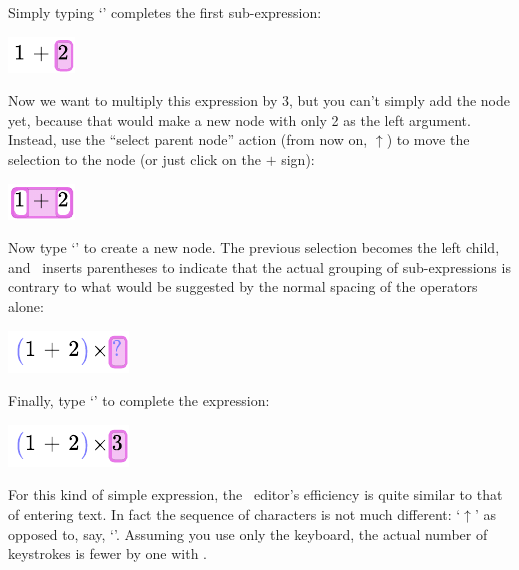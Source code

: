 Simply typing `' completes the first sub-expression:
\begin{center}
\includegraphics{src/image/expr4.pdf}
\end{center}

Now we want to multiply this expression by 3, but you can't simply add the  node yet, because that would make a new node with only 2 as the left argument. Instead, use the ``select parent node'' action (from now on, $\uparrow$) to move the selection to the  node (or just click on the $+$ sign):
\begin{center}
\includegraphics{src/image/expr5.pdf}
\end{center}

Now type `\clojure{*}' to create a new node. The previous selection becomes the left child, and \Meta\ inserts parentheses to indicate that the actual grouping of sub-expressions is contrary to what would be suggested by the normal spacing of the operators alone:
\begin{center}
\includegraphics{src/image/expr6.pdf}
\end{center}

Finally, type `' to complete the expression:
\begin{center}
\includegraphics{src/image/expr7.pdf}
\end{center}

For this kind of simple expression, the \Meta\ editor's efficiency is quite similar to that of entering text. In fact the sequence of characters is not much different: `$\uparrow$' as opposed to, say, `'. Assuming you use only the keyboard, the actual number of keystrokes is fewer by one with \Meta.

